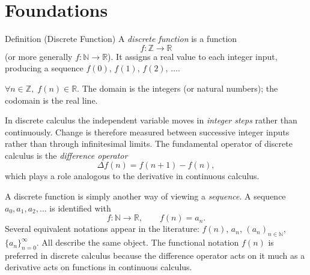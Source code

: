 
\section{Foundations}

\begin{definitionbox}{Definition (Discrete Function)}
A \emph{discrete function} is a function
\[
f:\mathbb{Z} \to \mathbb{R}
\]
(or more generally \(f:\mathbb{N}\to\mathbb{R}\)).
It assigns a real value to each integer input, producing a sequence
\(f(0),\, f(1),\, f(2),\, \dots\).
\end{definitionbox}
\label{def:discrete-function}

\begin{remark*}
\(\forall n \in \mathbb{Z},\; f(n) \in \mathbb{R}\).
The domain is the integers (or natural numbers); the codomain is the real line.
\end{remark*}

\begin{remark*}
In discrete calculus the independent variable moves in \emph{integer steps}
rather than continuously. Change is therefore measured between
successive integer inputs rather than through infinitesimal limits.
The fundamental operator of discrete calculus is the \emph{difference operator}
\[
\Delta f(n)=f(n+1)-f(n),
\]
which plays a role analogous to the derivative in continuous calculus.
\end{remark*}

\begin{remark*}
A discrete function is simply another way of viewing a \emph{sequence}.
A sequence \(a_0, a_1, a_2, \dots\) is identified with
\[
f : \mathbb{N} \to \mathbb{R}, \qquad f(n) = a_n.
\]
Several equivalent notations appear in the literature:
\(f(n)\), \(a_n\), \((a_n)_{n\in\mathbb{N}}\), \(\{a_n\}_{n=0}^{\infty}\).
All describe the same object. The functional notation \(f(n)\) is preferred
in discrete calculus because the difference operator acts on it much as a
derivative acts on functions in continuous calculus.
\end{remark*}
